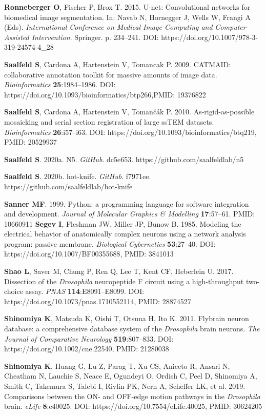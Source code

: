 \documentclass{article}
\begin{document}
\begin{hangpars}
\textbf{Ronneberger O}, Fischer P, Brox T. 2015. U-net: Convolutional networks for biomedical image segmentation. In: Navab N, Hornegger J, Wells W, Frangi A (Eds). \emph{International Conference on Medical Image Computing and} \emph{Computer-Assisted Intervention}. Springer. p. 234–241. DOI: https://doi.org/10.1007/978-3-319-24574-4\_28

\textbf{Saalfeld S}, Cardona A, Hartenstein V, Tomancak P. 2009. CATMAID: collaborative annotation toolkit for massive amounts of image data. \emph{Bioinformatics} \textbf{25}:1984–1986. DOI: https://doi.org/10.1093/bioinformatics/btp266,PMID: 19376822

\textbf{Saalfeld S}, Cardona A, Hartenstein V, Tomančák P. 2010. As-rigid-as-possible mosaicking and serial section registration of large ssTEM datasets. \emph{Bioinformatics} \textbf{26}:i57–i63. DOI: https://doi.org/10.1093/bioinformatics/btq219, PMID: 20529937

\textbf{Saalfeld S}. 2020a. N5. \emph{GitHub}. dc5e653. https://github.com/saalfeldlab/n5

\textbf{Saalfeld S}. 2020b. hot-knife. \emph{GitHub}. f7971ee. https://github.com/saalfeldlab/hot-knife

\textbf{Sanner MF}. 1999. Python: a programming language for software integration and development. \emph{Journal of} \emph{Molecular Graphics \& Modelling} \textbf{17}:57–61. PMID: 10660911 \textbf{Segev I}, Fleshman JW, Miller JP, Bunow B. 1985. Modeling the electrical behavior of anatomically complex neurons using a network analysis program: passive membrane. \emph{Biological Cybernetics} \textbf{53}:27–40. DOI: https://doi.org/10.1007/BF00355688, PMID: 3841013

\textbf{Shao L}, Saver M, Chung P, Ren Q, Lee T, Kent CF, Heberlein U. 2017. Dissection of the \emph{Drosophila} neuropeptide F circuit using a high-throughput two-choice assay. \emph{PNAS} \textbf{114}:E8091–E8099. DOI: https://doi.org/10.1073/pnas.1710552114, PMID: 28874527

\textbf{Shinomiya K}, Matsuda K, Oishi T, Otsuna H, Ito K. 2011. Flybrain neuron database: a comprehensive database system of the \emph{Drosophila} brain neurons. \emph{The Journal of Comparative Neurology} \textbf{519}:807–833. DOI: https://doi.org/10.1002/cne.22540, PMID: 21280038

\textbf{Shinomiya K}, Huang G, Lu Z, Parag T, Xu CS, Aniceto R, Ansari N, Cheatham N, Lauchie S, Neace E, Ogundeyi O, Ordish C, Peel D, Shinomiya A, Smith C, Takemura S, Talebi I, Rivlin PK, Nern A, Scheffer LK, et al. 2019. Comparisons between the ON- and OFF-edge motion pathways in the \emph{Drosophila} brain. \emph{eLife} \textbf{8}:e40025. DOI: https://doi.org/10.7554/eLife.40025, PMID: 30624205


\end{hangpars}
\end{document}

